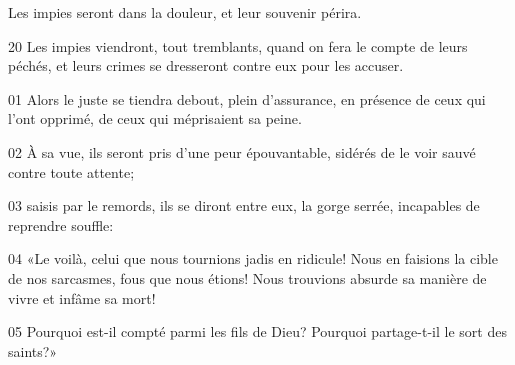 Les impies seront dans la douleur, et leur souvenir périra.

20 Les impies viendront, tout tremblants, quand on fera le compte de leurs péchés, et leurs crimes se dresseront contre eux pour les accuser.

01 Alors le juste se tiendra debout, plein d’assurance, en présence de ceux qui l’ont opprimé, de ceux qui méprisaient sa peine.

02 À sa vue, ils seront pris d’une peur épouvantable, sidérés de le voir sauvé contre toute attente;

03 saisis par le remords, ils se diront entre eux, la gorge serrée, incapables de reprendre souffle:

04 «Le voilà, celui que nous tournions jadis en ridicule! Nous en faisions la cible de nos sarcasmes, fous que nous étions! Nous trouvions absurde sa manière de vivre et infâme sa mort!

05 Pourquoi est-il compté parmi les fils de Dieu? Pourquoi partage-t-il le sort des saints?»